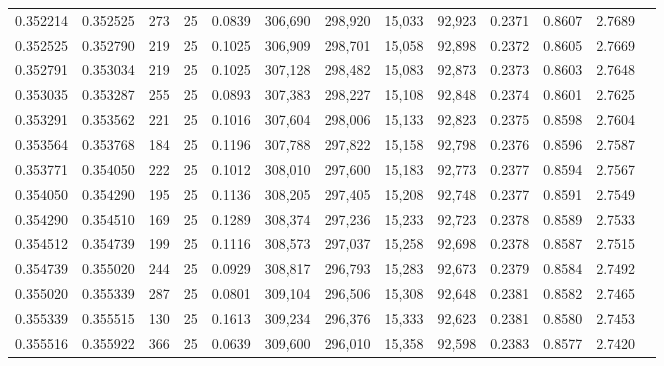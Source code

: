 \begin{tabular}{rrrrrrrrrrrrr}
0.352214 & 0.352525 &   273 &  25 &                                     0.0839 & 306,690 & 298,920 &  15,033 &  92,923 & 0.2371 & 0.8607 & 2.7689 \\
0.352525 & 0.352790 &   219 &  25 &                                     0.1025 & 306,909 & 298,701 &  15,058 &  92,898 & 0.2372 & 0.8605 & 2.7669 \\
0.352791 & 0.353034 &   219 &  25 &                                     0.1025 & 307,128 & 298,482 &  15,083 &  92,873 & 0.2373 & 0.8603 & 2.7648 \\
0.353035 & 0.353287 &   255 &  25 &                                     0.0893 & 307,383 & 298,227 &  15,108 &  92,848 & 0.2374 & 0.8601 & 2.7625 \\
0.353291 & 0.353562 &   221 &  25 &                                     0.1016 & 307,604 & 298,006 &  15,133 &  92,823 & 0.2375 & 0.8598 & 2.7604 \\
0.353564 & 0.353768 &   184 &  25 &                                     0.1196 & 307,788 & 297,822 &  15,158 &  92,798 & 0.2376 & 0.8596 & 2.7587 \\
0.353771 & 0.354050 &   222 &  25 &                                     0.1012 & 308,010 & 297,600 &  15,183 &  92,773 & 0.2377 & 0.8594 & 2.7567 \\
0.354050 & 0.354290 &   195 &  25 &                                     0.1136 & 308,205 & 297,405 &  15,208 &  92,748 & 0.2377 & 0.8591 & 2.7549 \\
0.354290 & 0.354510 &   169 &  25 &                                     0.1289 & 308,374 & 297,236 &  15,233 &  92,723 & 0.2378 & 0.8589 & 2.7533 \\
0.354512 & 0.354739 &   199 &  25 &                                     0.1116 & 308,573 & 297,037 &  15,258 &  92,698 & 0.2378 & 0.8587 & 2.7515 \\
0.354739 & 0.355020 &   244 &  25 &                                     0.0929 & 308,817 & 296,793 &  15,283 &  92,673 & 0.2379 & 0.8584 & 2.7492 \\
0.355020 & 0.355339 &   287 &  25 &                                     0.0801 & 309,104 & 296,506 &  15,308 &  92,648 & 0.2381 & 0.8582 & 2.7465 \\
0.355339 & 0.355515 &   130 &  25 &                                     0.1613 & 309,234 & 296,376 &  15,333 &  92,623 & 0.2381 & 0.8580 & 2.7453 \\
0.355516 & 0.355922 &   366 &  25 &                                     0.0639 & 309,600 & 296,010 &  15,358 &  92,598 & 0.2383 & 0.8577 & 2.7420 \\

\end{tabular}
